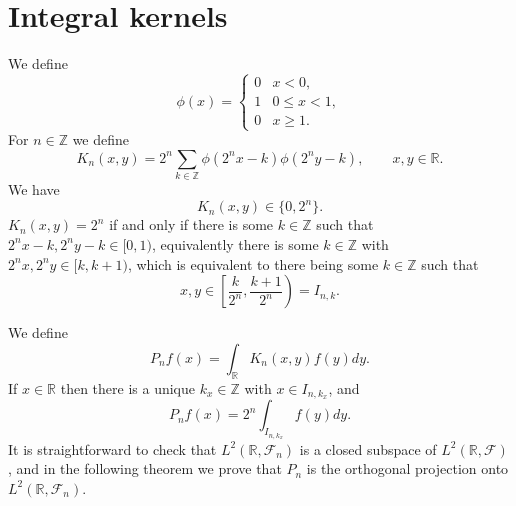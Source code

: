 \documentclass{article}
\theoremstyle{definition}
\begin{document}
\section{Integral kernels}
We define
\[
\phi(x)= \begin{cases}
0&x<0,\\
1&0 \leq x < 1,\\
0&x \geq 1.
\end{cases}
\] 
For $n \in \mathbb{Z}$ we define
\[
K_n(x,y) = 2^n \sum_{k \in \mathbb{Z}} \phi(2^nx-k)\phi(2^n y-k), \qquad x, y \in \mathbb{R}.
\]
We have
\[
K_n(x,y) \in \{0,2^n\}.
\]
$K_n(x,y)=2^n$ if and only if there is some $k \in \mathbb{Z}$ such that $2^n x-k, 2^ny-k \in [0,1)$, equivalently
 there is some $k \in \mathbb{Z}$ with $2^nx,2^ny \in [k,k+1)$, which is equivalent to there being some
$k \in \mathbb{Z}$ such that
\[
x,y \in \left[\frac{k}{2^n},\frac{k+1}{2^n}\right)=I_{n,k}.
\] 

We define
\[
P_n f(x)= \int_{\mathbb{R}} K_n(x,y) f(y) dy.
\]
If $x \in \mathbb{R}$ then there is a unique $k_x \in \mathbb{Z}$ with $x \in I_{n,k_x}$, and 
\begin{equation}
P_n f(x)=2^n \int_{I_{n,k_x}}  f(y)dy.
\label{boxprojection}
\end{equation}
It is straightforward to check
that $L^2(\mathbb{R},\mathscr{F}_n)$ is a closed subspace of $L^2(\mathbb{R},\mathscr{F})$, and in the following theorem
we prove that $P_n$ is the orthogonal projection onto $L^2(\mathbb{R},\mathscr{F}_n)$.
\end{document}
